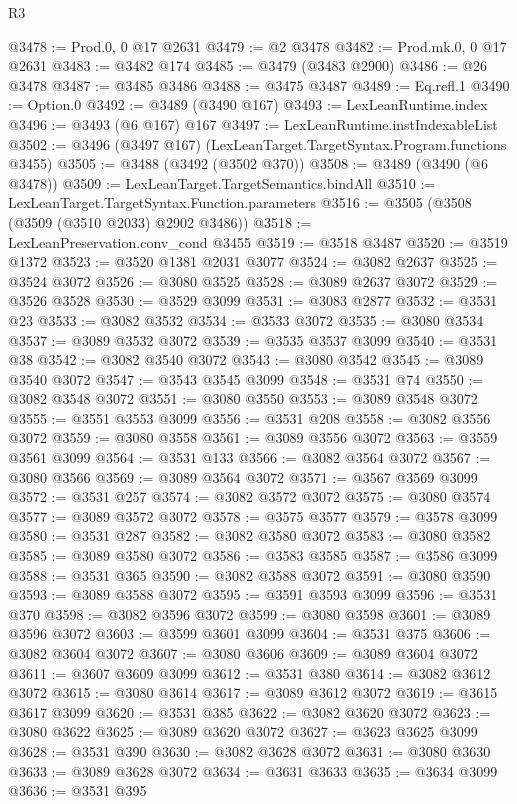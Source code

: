 \begin{lexlean}{R3}
\begin{coremodule}
@3478 := Prod.{0, 0} @17 @2631
@3479 := @2 @3478
@3482 := Prod.mk.{0, 0} @17 @2631
@3483 := @3482 @174
@3485 := @3479 (@3483 @2900)
@3486 := @26 @3478
@3487 := @3485 @3486
@3488 := @3475 @3487
@3489 := Eq.refl.{1}
@3490 := Option.{0}
@3492 := @3489 (@3490 @167)
@3493 := LexLeanRuntime.index
@3496 := @3493 (@6 @167) @167
@3497 := LexLeanRuntime.instIndexableList
@3502 := @3496 (@3497 @167) (LexLeanTarget.TargetSyntax.Program.functions @3455)
@3505 := @3488 (@3492 (@3502 @370))
@3508 := @3489 (@3490 (@6 @3478))
@3509 := LexLeanTarget.TargetSemantics.bindAll
@3510 := LexLeanTarget.TargetSyntax.Function.parameters
@3516 := @3505 (@3508 (@3509 (@3510 @2033) @2902 @3486))
@3518 := LexLeanPreservation.conv_cond @3455
@3519 := @3518 @3487
@3520 := @3519 @1372
@3523 := @3520 @1381 @2031 @3077
@3524 := @3082 @2637
@3525 := @3524 @3072
@3526 := @3080 @3525
@3528 := @3089 @2637 @3072
@3529 := @3526 @3528
@3530 := @3529 @3099
@3531 := @3083 @2877
@3532 := @3531 @23
@3533 := @3082 @3532
@3534 := @3533 @3072
@3535 := @3080 @3534
@3537 := @3089 @3532 @3072
@3539 := @3535 @3537 @3099
@3540 := @3531 @38
@3542 := @3082 @3540 @3072
@3543 := @3080 @3542
@3545 := @3089 @3540 @3072
@3547 := @3543 @3545 @3099
@3548 := @3531 @74
@3550 := @3082 @3548 @3072
@3551 := @3080 @3550
@3553 := @3089 @3548 @3072
@3555 := @3551 @3553 @3099
@3556 := @3531 @208
@3558 := @3082 @3556 @3072
@3559 := @3080 @3558
@3561 := @3089 @3556 @3072
@3563 := @3559 @3561 @3099
@3564 := @3531 @133
@3566 := @3082 @3564 @3072
@3567 := @3080 @3566
@3569 := @3089 @3564 @3072
@3571 := @3567 @3569 @3099
@3572 := @3531 @257
@3574 := @3082 @3572 @3072
@3575 := @3080 @3574
@3577 := @3089 @3572 @3072
@3578 := @3575 @3577
@3579 := @3578 @3099
@3580 := @3531 @287
@3582 := @3082 @3580 @3072
@3583 := @3080 @3582
@3585 := @3089 @3580 @3072
@3586 := @3583 @3585
@3587 := @3586 @3099
@3588 := @3531 @365
@3590 := @3082 @3588 @3072
@3591 := @3080 @3590
@3593 := @3089 @3588 @3072
@3595 := @3591 @3593 @3099
@3596 := @3531 @370
@3598 := @3082 @3596 @3072
@3599 := @3080 @3598
@3601 := @3089 @3596 @3072
@3603 := @3599 @3601 @3099
@3604 := @3531 @375
@3606 := @3082 @3604 @3072
@3607 := @3080 @3606
@3609 := @3089 @3604 @3072
@3611 := @3607 @3609 @3099
@3612 := @3531 @380
@3614 := @3082 @3612 @3072
@3615 := @3080 @3614
@3617 := @3089 @3612 @3072
@3619 := @3615 @3617 @3099
@3620 := @3531 @385
@3622 := @3082 @3620 @3072
@3623 := @3080 @3622
@3625 := @3089 @3620 @3072
@3627 := @3623 @3625 @3099
@3628 := @3531 @390
@3630 := @3082 @3628 @3072
@3631 := @3080 @3630
@3633 := @3089 @3628 @3072
@3634 := @3631 @3633
@3635 := @3634 @3099
@3636 := @3531 @395

\end{coremodule}
\end{lexlean}
